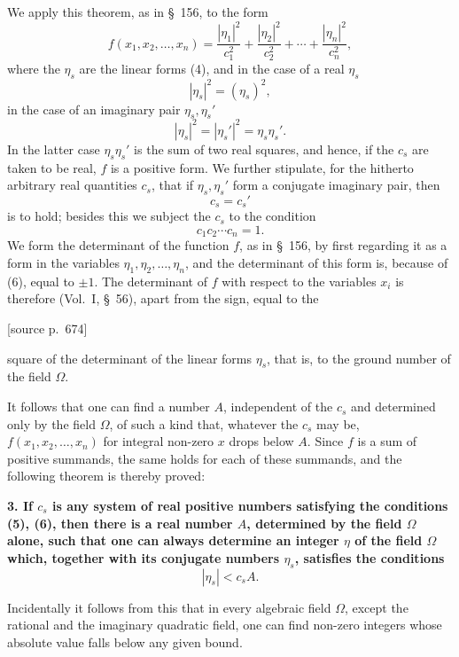 \documentclass[11pt]{article}
\newcommand{\srcpage}[1]{\par\medskip\noindent\textsf{[source p.~#1]}\par\smallskip}
\begin{document}
We apply this theorem, as in \S~156, to the form
\[
f(x_1,x_2,\ldots,x_n)=\frac{|\eta_1|^2}{c_1^2}+\frac{|\eta_2|^2}{c_2^2}+\cdots+\frac{|\eta_n|^2}{c_n^2},
\]
where the $\eta_s$ are the linear forms (4), and in the case of a real $\eta_s$
\[
|\eta_s|^2=(\eta_s)^2,
\]
in the case of an imaginary pair $\eta_s,\eta_s'$
\[
|\eta_s|^2=|\eta_s'|^2=\eta_s\eta_s'.
\]
In the latter case $\eta_s\eta_s'$ is the sum of two real squares, and hence, if the $c_s$ are taken to be real, $f$ is a positive form. We further stipulate, for the hitherto arbitrary real quantities $c_s$, that if $\eta_s,\eta_s'$ form a conjugate imaginary pair, then
\begin{equation}
c_s=c_s'
\tag{5}
\end{equation}
is to hold; besides this we subject the $c_s$ to the condition
\begin{equation}
c_1c_2\cdots c_n=1.
\tag{6}
\end{equation}
We form the determinant of the function $f$, as in \S~156, by first regarding it as a form in the variables $\eta_1,\eta_2,\ldots,\eta_n$, and the determinant of this form is, because of (6), equal to $\pm1$. The determinant of $f$ with respect to the variables $x_i$ is therefore (Vol.~I, \S~56), apart from the sign, equal to the
\srcpage{674}
square of the determinant of the linear forms $\eta_s$, that is, to the ground number of the field $\Omega$.

It follows that one can find a number $A$, independent of the $c_s$ and determined only by the field $\Omega$, of such a kind that, whatever the $c_s$ may be, $f(x_1,x_2,\ldots,x_n)$ for integral non-zero $x$ drops below $A$. Since $f$ is a sum of positive summands, the same holds for each of these summands, and the following theorem is thereby proved:

\textbf{3. If $c_s$ is any system of real positive numbers satisfying the conditions (5), (6), then there is a real number $A$, determined by the field $\Omega$ alone, such that one can always determine an integer $\eta$ of the field $\Omega$ which, together with its conjugate numbers $\eta_s$, satisfies the conditions}
\begin{equation}
|\eta_s|<c_sA.
\tag{7}
\end{equation}

Incidentally it follows from this that in every algebraic field $\Omega$, except the rational and the imaginary quadratic field, one can find non-zero integers whose absolute value falls below any given bound.
\end{document}
